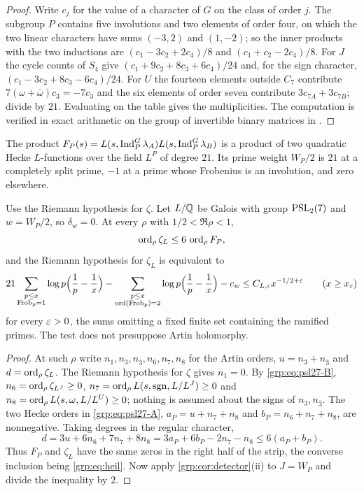 \begin{proof}
Write $c_j$ for the value of a character of $G$ on the class of order $j$. The
subgroup $P$ contains five involutions and two elements of order four, on
which the two linear characters have sums $(-3,2)$ and $(1,-2)$; so the inner
products with the two inductions are $(c_1-3c_2+2c_4)/8$ and
$(c_1+c_2-2c_4)/8$. For $J$ the cycle counts of $S_4$ give
$(c_1+9c_2+8c_3+6c_4)/24$ and, for the sign character,
$(c_1-3c_2+8c_3-6c_4)/24$. For $U$ the fourteen elements outside $C_7$
contribute $7(\omega+\bar\omega)c_3=-7c_3$ and the six elements of order seven
contribute $3c_{7A}+3c_{7B}$; divide by $21$. Evaluating on the table gives
the multiplicities. The computation is verified in exact arithmetic on the
group of invertible binary matrices in
.
\end{proof}

The product $F_P(s)=L(s,\operatorname{Ind}_P^G\lambda_A)L(s,\operatorname{Ind}_P^G\lambda_B)$ is a product
of two quadratic Hecke $L$-functions over the field $L^P$ of degree $21$. Its
prime weight $W_P/2$ is $21$ at a completely split prime, $-1$ at a prime
whose Frobenius is an involution, and zero elsewhere.

\begin{theorem}\label{grp:thm:psl27}
Use the Riemann hypothesis for $\zeta$. Let $L/\mathbb{Q}$ be Galois with group
$\operatorname{PSL}_2(7)$ and $w=W_P/2$, so $\delta_w=0$. At every $\rho$ with
$1/2<\Re\rho<1$,
\[
 \operatorname{ord}_\rho\zeta_L\le6\,\operatorname{ord}_\rho F_P ,
\]
and the Riemann hypothesis for $\zeta_L$ is equivalent to
\begin{equation}\label{grp:eq:psl27-test}
 21\sum_{\substack{p\le x\\\operatorname{Frob}_p=1}}\log p\Bigl(\frac1p-\frac1x\Bigr)
 -\sum_{\substack{p\le x\\\operatorname{ord}(\operatorname{Frob}_p)=2}}\log p\Bigl(\frac1p-\frac1x\Bigr)
 -c_w\le C_{L,\varepsilon}x^{-1/2+\varepsilon}\qquad(x\ge x_\varepsilon)
\end{equation}
for every $\varepsilon>0$, the sums omitting a fixed finite set containing the
ramified primes. The test does not presuppose Artin holomorphy.
\end{theorem}

\begin{proof}
At such $\rho$ write $n_1,n_3,n_{\bar3},n_6,n_7,n_8$ for the Artin orders,
$u=n_3+n_{\bar3}$ and $d=\operatorname{ord}_\rho\zeta_L$. The Riemann hypothesis for $\zeta$
gives $n_1=0$. By \eqref{grp:eq:psl27-B}, $n_6=\operatorname{ord}_\rho\zeta_{L^J}\ge0$,
$n_7=\operatorname{ord}_\rho L(s,\operatorname{sgn},L/L^J)\ge0$ and
$n_8=\operatorname{ord}_\rho L(s,\omega,L/L^U)\ge0$; nothing is assumed about the signs of
$n_3,n_{\bar3}$. The two Hecke orders in \eqref{grp:eq:psl27-A},
$a_P=u+n_7+n_8$ and $b_P=n_6+n_7+n_8$, are nonnegative. Taking degrees in the
regular character,
\[
 d=3u+6n_6+7n_7+8n_8=3a_P+6b_P-2n_7-n_8\le6(a_P+b_P).
\]
Thus $F_P$ and $\zeta_L$ have the same zeros in the right half of the strip,
the converse inclusion being \eqref{grp:eq:heil}. Now apply
\cref{grp:cor:detector}(ii) to $J=W_P$ and divide the inequality by $2$.
\end{proof}

